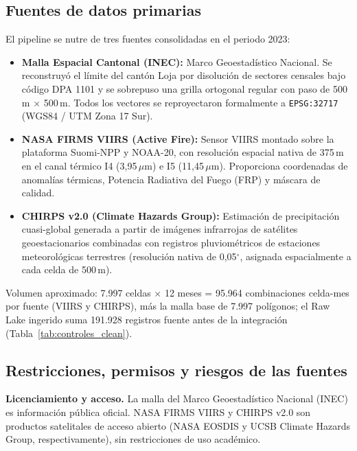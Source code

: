 \documentclass[11pt,a4paper]{article}
\begin{document}
\subsection{Fuentes de datos primarias}
El pipeline se nutre de tres fuentes consolidadas en el periodo 2023:
\begin{itemize}
    \item \textbf{Malla Espacial Cantonal (INEC):} Marco Geoestad\'istico Nacional. Se reconstruy\'o el l\'imite del cant\'on Loja por disoluci\'on de sectores censales bajo c\'odigo DPA 1101 y se sobrepuso una grilla ortogonal regular con paso de 500\,m $\times$ 500\,m. Todos los vectores se reproyectaron formalmente a \texttt{EPSG:32717} (WGS84 / UTM Zona 17 Sur).
    \item \textbf{NASA FIRMS VIIRS (Active Fire):} Sensor VIIRS montado sobre la plataforma Suomi-NPP y NOAA-20, con resoluci\'on espacial nativa de 375\,m en el canal t\'ermico I4 (3,95\,$\mu$m) e I5 (11,45\,$\mu$m). Proporciona coordenadas de anomal\'ias t\'ermicas, Potencia Radiativa del Fuego (FRP) y m\'ascara de calidad.
    \item \textbf{CHIRPS v2.0 (Climate Hazards Group):} Estimaci\'on de precipitaci\'on cuasi-global generada a partir de im\'agenes infrarrojas de sat\'elites geoestacionarios combinadas con registros pluviom\'etricos de estaciones meteorol\'ogicas terrestres (resoluci\'on nativa de 0,05$^\circ$, asignada espacialmente a cada celda de 500\,m).
\end{itemize}
Volumen aproximado: 7.997 celdas $\times$ 12 meses = 95.964 combinaciones celda-mes por fuente (VIIRS y CHIRPS), m\'as la malla base de 7.997 pol\'igonos; el Raw Lake ingerido suma 191.928 registros fuente antes de la integraci\'on (Tabla~\ref{tab:controles_clean}).

\subsection{Restricciones, permisos y riesgos de las fuentes}
\textbf{Licenciamiento y acceso.} La malla del Marco Geoestad\'istico Nacional (INEC) es informaci\'on p\'ublica oficial. NASA FIRMS VIIRS y CHIRPS v2.0 son productos satelitales de acceso abierto (NASA EOSDIS y UCSB Climate Hazards Group, respectivamente), sin restricciones de uso acad\'emico.
\end{document}
